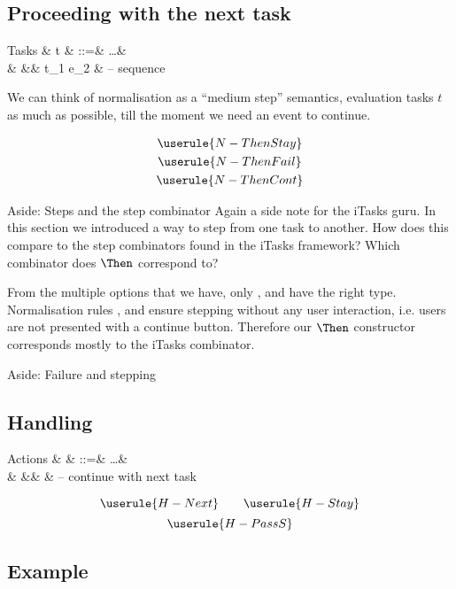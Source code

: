 \subsection{Proceeding with the next task}

\begin{grammar}
  Tasks
    & t & ::=& \ldots        & \\
    &   &\mid& t_1 \Then e_2 & – sequence \\
\end{grammar}

We can think of normalisation as a \enquote{medium step} semantics,
evaluation tasks $t$ as much as possible,
till the moment we need an event to continue.

\begin{gather*}
  \userule{N-ThenStay} \\
  \userule{N-ThenFail} \\
  \userule{N-ThenCont}
\end{gather*}

\begin{margintext}{Aside: Steps and the step combinator}
Again a side note for the iTasks guru.
In this section we introduced a way to step from one task to another.
How does this compare to the step combinators found in the iTasks framework?
Which combinator does $\Then$ correspond to?

From the multiple options that we have,
only \type{(>>=)}, \type{(>>-)} and \type{(>>\texttilde)} have the right type.
Normalisation rules ,  and  ensure stepping without any user interaction,
i.e. users are not presented with a continue button.
Therefore our $\Then$ constructor corresponds mostly to the iTasks \type{(>>-)} combinator.
\end{margintext}

\begin{margintext}{Aside: Failure and stepping}
\end{margintext}



\subsection{Handling}

\begin{grammar}
  Actions
    & \alpha & ::=& \ldots & \\
    &        &\mid& \Next  & – continue with next task \\
\end{grammar}

\begin{equation*}
  \userule{H-Next} \qquad \userule{H-Stay}
\end{equation*}
\begin{equation*}
  \userule{H-PassS}
\end{equation*}

\subsection{Example}

